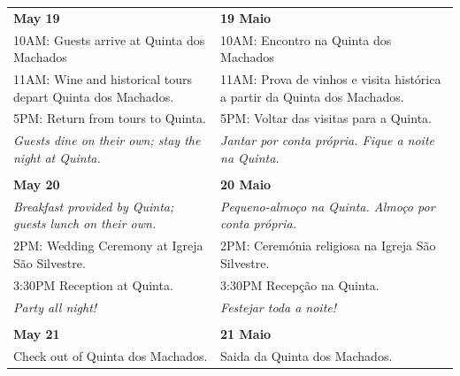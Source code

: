 \documentclass[6pt]{article}
\begin{document}
\pagestyle{empty}

\small 
\begin{tabular}{p{2.125in}|p{2.125in}}
  \textbf{May 19} & \textbf{19 Maio} \\
  {10AM:} Guests arrive at Quinta dos Machados
  &
  {10AM:} Encontro na Quinta dos Machados\\
  {11AM:} Wine and historical tours depart Quinta dos Machados. 
  &
  {11AM:} Prova de vinhos e visita histórica a partir da Quinta dos Machados.\\
  {5PM:} Return from tours to Quinta.
  &
  {5PM:} Voltar das visitas para a Quinta.
  \\
  {\it Guests dine on their own; stay the night at Quinta.}
  &
  {\it Jantar por conta própria. Fique a noite na Quinta.}\\
  &\\
  {\bf May 20} & {\bf 20 Maio} \\
  {\it Breakfast provided by Quinta; guests lunch on their own.}
  &
  {\it Pequeno-almoço na Quinta. Almoço por conta própria.}
  \\
  {2PM:} Wedding Ceremony at Igreja São Silvestre.
  &
  {2PM}: Ceremónia religiosa na Igreja São Silvestre.
  \\
  {3:30PM} Reception at Quinta.
  &
  {3:30PM} Recepção na Quinta.
  \\
  {\it Party all night!}&{\it Festejar toda a noite!}
  \\
  &\\
  {\bf May 21} & {\bf 21 Maio} \\
  Check out of Quinta dos Machados. & Saida da Quinta dos Machados.\\
\end{tabular}
\end{document}

